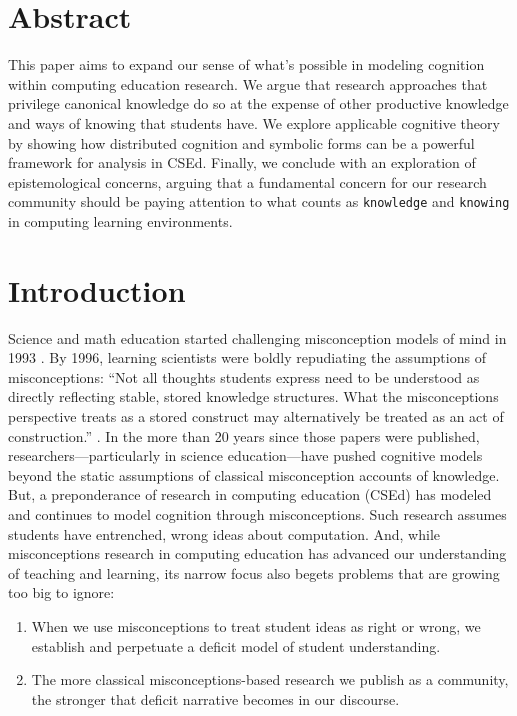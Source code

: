 \section{Abstract}\label{Abstract}

This paper aims to expand our sense of what's possible in modeling cognition within computing education research. We argue that research
approaches that privilege canonical knowledge do so at the
expense of other productive knowledge and ways of knowing that students
have. We explore applicable cognitive theory by showing how distributed cognition and symbolic forms can be a powerful framework for analysis in CSEd. Finally, we conclude with an exploration of epistemological concerns, arguing that a fundamental concern for our research community should be paying attention to what counts as \texttt{knowledge} and \texttt{knowing} in computing learning environments.

\section{Introduction}\label{Introduction}

Science and math education started challenging misconception models of mind in 1993 \cite{disessa_epistemology_1993,smith_misconceptions_1993}. By 1996, learning scientists were boldly repudiating the assumptions of misconceptions: ``Not all thoughts students express need to be understood as directly reflecting stable, stored knowledge structures. What the misconceptions perspective treats as a stored construct may alternatively be treated as an act of construction.'' \cite{hammer_misconceptions_1996}. In the more than 20 years since those papers were published, researchers---particularly in science education---have pushed cognitive models beyond the static assumptions of classical misconception accounts of knowledge. But, a preponderance of research in computing education (CSEd) has modeled and continues to model cognition through misconceptions. Such research assumes students have entrenched, wrong ideas about computation. And, while misconceptions research in computing education has advanced our understanding of teaching and learning, its narrow focus also begets problems that are growing too big to ignore:

\begin{enumerate}
  \tightlist
  \item When we use misconceptions to treat student ideas as right or wrong, we establish and perpetuate a deficit model of student understanding.
  \item The more classical misconceptions-based research we publish as a community, the stronger that deficit narrative becomes in our discourse.
\end{enumerate}

